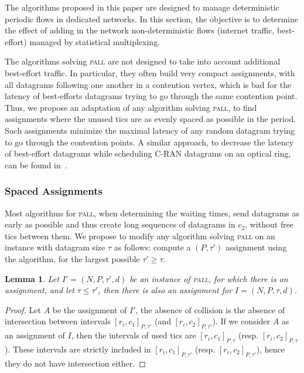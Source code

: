 \documentclass[a4paper,10pt]{journal}
\newtheorem{lemma}[theorem]{Lemma}
\newcommand\pall{\textsc{pall}\xspace}
\begin{document}
    The algorithms proposed in this paper are designed to manage deterministic periodic flows in dedicated networks. In this section, the objective is to determine the effect of adding in the network non-deterministic flows (internet traffic, best-effort) managed by statistical multiplexing.

    The algorithms solving \pall are not designed to take into account additional best-effort traffic. In particular, they often build very compact assignments, with all datagrams following one another in a contention vertex, which is bad for the latency of best-efforts datagrams trying to go through the same contention point. Thus, we propose an adaptation of any algorithm solving \pall, to find assignments where the unused tics are as evenly spaced as possible in the period. Such assignments minimize the maximal latency of any random datagram trying to go through the contention points. A similar approach, to decrease the latency of best-effort datagrams while scheduling C-RAN datagrams on an optical ring, can be found in~\cite{DBLP:conf/ondm/BarthGS19}.
    
    
    \subsubsection{Spaced Assignments}

    Most algorithms for \pall, when determining the waiting times, send datagrams as early as possible
    and thus create long sequences of datagrams in $c_2$, without free tics between them. We propose to modify any algorithm solving \pall on an instance with datagram size $\tau$ as follows: compute a $(P,\tau')$ assignment using the algorithm, for the largest possible $\tau' \geq \tau$. 

    \begin{lemma}\label{lemma:smaller_tau}
    Let $I' = (N,P,\tau',d)$ be an instance of \pall, for which there is an assignment, and let 
    $\tau \leq \tau'$, then there is also an assignment for $I = (N,P,\tau,d)$.
    \end{lemma}  
    \begin{proof}
    Let $A$ be the assignment of $I'$, the absence of collision is the absence of 
    intersection between intervals $[r_i,c_1]_{P,\tau'}$ (and $[r_i,c_2]_{P,\tau'}$). 
    If we consider $A$ as an assignment of $I$, then the intervals of used tics are $[r_i,c_1]_{P,\tau}$ (resp. $[r_i,c_2]_{P,\tau}$). 
    These intervals are strictly included in $[r_i,c_1]_{P,\tau'}$ (resp. $[r_i,c_2]_{P,\tau'}$), hence they do not have intersection either. 
    \end{proof}
\end{document}
